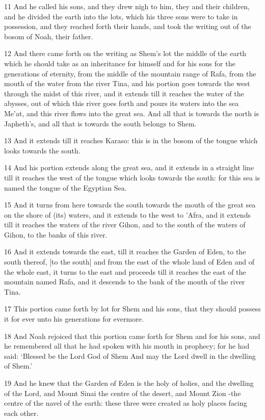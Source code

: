 \par 11 And he called his sons, and they drew nigh to him, they and their children, and he divided the earth into the lots, which his three sons were to take in possession, and they reached forth their hands, and took the writing out of the bosom of Noah, their father.
\par 12 And there came forth on the writing as Shem's lot the middle of the earth which he should take as an inheritance for himself and for his sons for the generations of eternity, from the middle of the mountain range of Rafa, from the mouth of the water from the river Tina, and his portion goes towards the west through the midst of this river, and it extends till it reaches the water of the abysses, out of which this river goes forth and pours its waters into the sea Me'at, and this river flows into the great sea. And all that is towards the north is Japheth's, and all that is towards the south belongs to Shem.
\par 13 And it extends till it reaches Karaso: this is in the bosom of the tongue which looks towards the south.
\par 14 And his portion extends along the great sea, and it extends in a straight line till it reaches the west of the tongue which looks towards the south: for this sea is named the tongue of the Egyptian Sea.
\par 15 And it turns from here towards the south towards the mouth of the great sea on the shore of (its) waters, and it extends to the west to 'Afra, and it extends till it reaches the waters of the river Gihon, and to the south of the waters of Gihon, to the banks of this river.
\par 16 And it extends towards the east, till it reaches the Garden of Eden, to the south thereof, [to the south] and from the east of the whole land of Eden and of the whole east, it turns to the east and proceeds till it reaches the east of the mountain named Rafa, and it descends to the bank of the mouth of the river Tina.
\par 17 This portion came forth by lot for Shem and his sons, that they should possess it for ever unto his generations for evermore.
\par 18 And Noah rejoiced that this portion came forth for Shem and for his sons, and he remembered all that he had spoken with his mouth in prophecy; for he had said: ‘Blessed be the Lord God of Shem And may the Lord dwell in the dwelling of Shem.’
\par 19 And he knew that the Garden of Eden is the holy of holies, and the dwelling of the Lord, and Mount Sinai the centre of the desert, and Mount Zion -the centre of the navel of the earth: these three were created as holy places facing each other.
